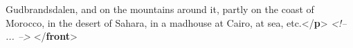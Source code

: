 \begin{shaded}
\hspace*{1em}\hspace*{1em}\hspace*{1em}\hspace*{1em} Gudbrandsdalen, and on the mountains around it, partly on the coast\mbox{}\newline 
\hspace*{1em}\hspace*{1em}\hspace*{1em}\hspace*{1em} of Morocco, in the desert of Sahara, in a madhouse at Cairo, at sea,\mbox{}\newline 
\hspace*{1em}\hspace*{1em}\hspace*{1em}\hspace*{1em} etc.{</\textbf{p}>}\mbox{}\newline 
{}\mbox{}\newline 
{}\mbox{}\newline 
\hspace*{1em}\mbox{}\newline 
\textit{<!-- ... -->}\mbox{}\newline 
\hspace*{1em}\mbox{}\newline 
{}\mbox{}\newline 
{</\textbf{front}>}\end{shaded}\egroup\par 
